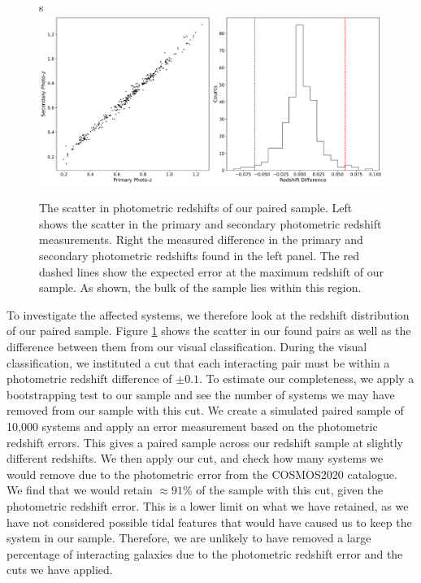 \begin{figure}s
\centering
\includegraphics[width=\textwidth]{Chapter3/figures/redshift_scatter.pdf}
\caption[The scatter in photometric redshifts of our paired sample.]{The scatter in photometric redshifts of our paired sample. Left shows the scatter in the primary and secondary photometric redshift measurements. Right the measured difference in the primary and secondary photometric redshifts found in the left panel. The red dashed lines show the expected error at the maximum redshift of our sample. As shown, the bulk of the sample lies within this region.}
\label{fig:redshift-scatter}
\end{figure}

To investigate the affected systems, we therefore look at the redshift distribution of our paired sample. Figure \ref{fig:redshift-scatter} shows the scatter in our found pairs as well as the difference between them from our visual classification. During the visual classification, we instituted a cut that each interacting pair must be within a photometric redshift difference of $\pm0.1$. To estimate our completeness, we apply a bootstrapping test to our sample and see the number of systems we may have removed from our sample with this cut. We create a simulated paired sample of 10,000 systems and apply an error measurement based on the photometric redshift errors. This gives a paired sample across our redshift sample at slightly different redshifts. We then apply our cut, and check how many systems we would remove due to the photometric error from the COSMOS2020 catalogue. We find that we would retain $\approx91$\% of the sample with this cut, given the photometric redshift error. This is a lower limit on what we have retained, as we have not considered possible tidal features that would have caused us to keep the system in our sample. Therefore, we are unlikely to have removed a large percentage of interacting galaxies due to the photometric redshift error and the cuts we have applied.

